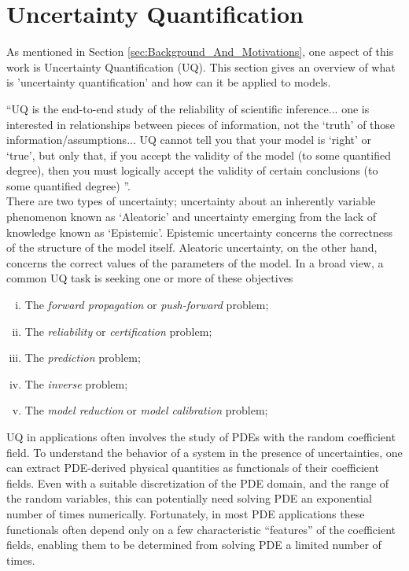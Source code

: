 \section{Uncertainty Quantification}
As mentioned in Section \eqref{sec:Background_And_Motivations}, one aspect of this work is Uncertainty Quantification (UQ). This section gives an overview of what is 'uncertainty quantification' and how can it be applied to models.

``UQ is the end-to-end study of the reliability of scientific inference... one is interested in relationships between pieces of information, not the `truth' of those information/assumptions... UQ cannot tell you that your model is `right' or `true', but only that, if you accept the validity of the model (to some quantified degree), then you must logically accept the validity of certain conclusions (to some quantified degree) ''\cite{UQIntro_Sullivan}.\\
There are two types of uncertainty; uncertainty about an inherently variable phenomenon known as `Aleatoric' and uncertainty emerging from the lack of knowledge known as `Epistemic'. Epistemic uncertainty concerns the correctness of the structure of the model itself. Aleatoric uncertainty, on the other hand, concerns the correct values of the parameters of the model.
In a broad view, a common UQ task is seeking one or more of these objectives 
\begin{enumerate}[i.]
	\item The \textit{forward propagation} or \textit{push-forward} problem; 
	\item The \textit{reliability} or \textit{certification} problem;
	\item The \textit{prediction} problem;
	\item The \textit{inverse} problem;
	\item The \textit{model reduction} or \textit{model calibration} problem; 
\end{enumerate}

UQ in applications often involves the study of PDEs with the random coefficient field. To understand the behavior of a system in the presence of uncertainties, one can extract PDE-derived physical quantities as functionals of their coefficient fields. Even with a suitable discretization of the PDE domain, and the range of the random variables, this can potentially need solving PDE an exponential number of times numerically. Fortunately, in most PDE applications these functionals often depend only on a few characteristic ``features'' of the coefficient fields, enabling them to be determined from solving PDE a limited number of times.\\

